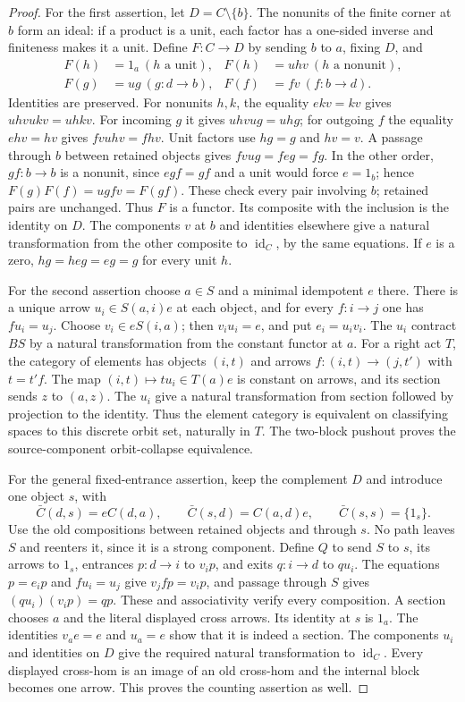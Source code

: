 \begin{proof}
For the first assertion, let $D=C\setminus\{b\}$.
The nonunits of the finite corner at $b$ form an ideal:
if a product is a unit, each factor has a one-sided
inverse and finiteness makes it a unit.  Define
$F:C\to D$ by sending $b$ to $a$, fixing $D$, and
\[
 \begin{aligned}
 F(h)&=1_a\ (h\text{ a unit}),& F(h)&=uhv\ (h\text{ a nonunit}),\\
 F(g)&=ug\ (g:d\to b),& F(f)&=fv\ (f:b\to d).
 \end{aligned}
\]
Identities are preserved.  For nonunits $h,k$, the
equality $ekv=kv$ gives $uhvukv=uhkv$.  For incoming
$g$ it gives $uhvug=uhg$; for outgoing $f$ the equality
$ehv=hv$ gives $fvuhv=fhv$.  Unit factors use $hg=g$
and $hv=v$.  A passage through $b$ between retained
objects gives $fvug=feg=fg$.  In the other order,
$gf:b\to b$ is a nonunit, since $egf=gf$ and a unit
would force $e=1_b$; hence $F(g)F(f)=ugfv=F(gf)$.
These check every pair involving $b$; retained pairs
are unchanged.  Thus $F$ is a functor.  Its composite
with the inclusion is the identity on $D$.  The
components $v$ at $b$ and identities elsewhere give
a natural transformation from the other composite to
$\operatorname{id}_C$, by the same equations.  If $e$
is a zero, $hg=heg=eg=g$ for every unit $h$.

For the second assertion choose $a\in S$ and a minimal
idempotent $e$ there.  There is a unique arrow
$u_i\in S(a,i)e$ at each object, and for every
$f:i\to j$ one has $fu_i=u_j$.  Choose
$v_i\in eS(i,a)$; then $v_iu_i=e$, and put
$e_i=u_iv_i$.  The $u_i$ contract $BS$ by a natural
transformation from the constant functor at $a$.
For a right act $T$, the category of elements has
objects $(i,t)$ and arrows $f:(i,t)\to(j,t')$ with
$t=t'f$.  The map $(i,t)\mapsto tu_i\in T(a)e$
is constant on arrows, and its section sends $z$ to
$(a,z)$.  The $u_i$ give a natural transformation
from section followed by projection to the identity.
Thus the element category is equivalent on classifying
spaces to this discrete orbit set, naturally in $T$.
The two-block pushout proves the source-component
orbit-collapse equivalence.

For the general fixed-entrance assertion, keep the
complement $D$ and introduce one object $s$, with
\[
 \bar C(d,s)=eC(d,a),\qquad \bar C(s,d)=C(a,d)e,
 \qquad \bar C(s,s)=\{1_s\}.
\]
Use the old compositions between retained objects and
through $s$.  No path leaves $S$ and reenters it, since
it is a strong component.  Define $Q$ to send $S$ to
$s$, its arrows to $1_s$, entrances $p:d\to i$ to
$v_ip$, and exits $q:i\to d$ to $qu_i$.
The equations $p=e_ip$ and $fu_i=u_j$ give
$v_jfp=v_ip$, and passage through $S$ gives
$(qu_i)(v_ip)=qp$.  These and associativity verify
every composition.  A section chooses $a$ and the
literal displayed cross arrows.  Its identity at
$s$ is $1_a$.  The identities $v_ae=e$ and $u_a=e$
show that it is indeed a section.  The components
$u_i$ and identities on $D$ give the required natural
transformation to $\operatorname{id}_C$.
Every displayed cross-hom is an image of an old
cross-hom and the internal block becomes one arrow.
This proves the counting assertion as well.
\end{proof}

